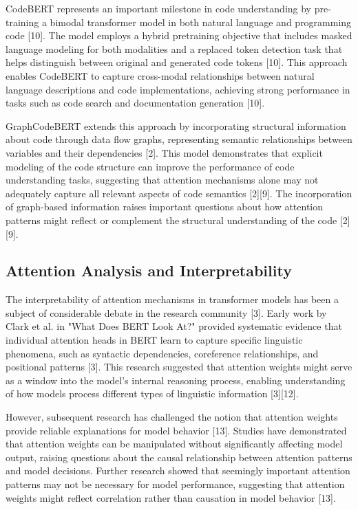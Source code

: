 \documentclass[conference]{IEEEtran}
\begin{document}
CodeBERT represents an important milestone in code understanding by pre-training a bimodal transformer model in both natural language and programming code [10]. The model employs a hybrid pretraining objective that includes masked language modeling for both modalities and a replaced token detection task that helps distinguish between original and generated code tokens [10]. This approach enables CodeBERT to capture cross-modal relationships between natural language descriptions and code implementations, achieving strong performance in tasks such as code search and documentation generation [10].

GraphCodeBERT extends this approach by incorporating structural information about code through data flow graphs, representing semantic relationships between variables and their dependencies [2]. This model demonstrates that explicit modeling of the code structure can improve the performance of code understanding tasks, suggesting that attention mechanisms alone may not adequately capture all relevant aspects of code semantics [2][9]. The incorporation of graph-based information raises important questions about how attention patterns might reflect or complement the structural understanding of the code [2][9].

\subsection{Attention Analysis and Interpretability}
The interpretability of attention mechanisms in transformer models has been a subject of considerable debate in the research community [3]. Early work by Clark et al. in "What Does BERT Look At?" provided systematic evidence that individual attention heads in BERT learn to capture specific linguistic phenomena, such as syntactic dependencies, coreference relationships, and positional patterns [3]. This research suggested that attention weights might serve as a window into the model's internal reasoning process, enabling understanding of how models process different types of linguistic information [3][12].

However, subsequent research has challenged the notion that attention weights provide reliable explanations for model behavior [13]. Studies have demonstrated that attention weights can be manipulated without significantly affecting model output, raising questions about the causal relationship between attention patterns and model decisions. Further research showed that seemingly important attention patterns may not be necessary for model performance, suggesting that attention weights might reflect correlation rather than causation in model behavior [13].
\end{document}
